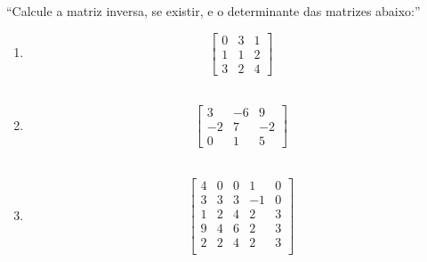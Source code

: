 \enquote{Calcule a matriz inversa, se existir, e o determinante das matrizes abaixo:}
    \begin{enumerate}
        \item 
        \begin{displaymath}
            \left[\begin{array}{ccc}
                 0 & 3 & 1  \\
                 1 & 1 & 2 \\
                 3 & 2 & 4
            \end{array}\right]
        \end{displaymath} \\
        

        \item \begin{displaymath}
            \left[\begin{array}{ccc}
            3 & -6 & 9 \\
            -2 & 7 & -2 \\
            0 & 1 & 5
            \end{array}\right]
        \end{displaymath} \\
        
        
        \item \begin{displaymath}
            \left[\begin{array}{ccccc}
                 4 & 0 & 0 & 1 & 0 \\
                 3 & 3 & 3 & -1 & 0 \\
                 1 & 2 & 4 & 2 & 3 \\
                 9 & 4 & 6 & 2 & 3 \\
                 2 & 2 & 4 & 2 & 3 \\
            \end{array}\right]
        \end{displaymath} \\
        
    \end{enumerate}            